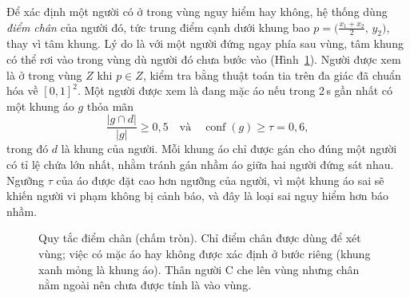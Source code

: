 \documentclass[11pt,a4paper,twocolumn]{article}
\begin{document}
Để xác định một người có ở trong vùng nguy hiểm hay không, hệ thống dùng \emph{điểm chân} của người đó, tức trung điểm cạnh dưới khung bao
$p=\big(\tfrac{x_1+x_2}{2},\,y_2\big)$, thay vì tâm khung. Lý do là với một người đứng ngay phía sau vùng, tâm khung có thể rơi vào trong vùng dù người đó chưa bước vào
(Hình~\ref{fig:foot}). Người được xem là ở trong vùng $Z$ khi $p\in Z$, kiểm tra bằng thuật toán tia trên đa giác đã chuẩn hóa về $[0,1]^2$.
Một người được xem là đang mặc áo nếu trong 2\,s gần nhất có một khung áo $g$ thỏa mãn
\begin{equation}
  \frac{|g\cap d|}{|g|}\ge 0{,}5\quad\text{và}\quad \operatorname{conf}(g)\ge\tau=0{,}6,
\end{equation}
trong đó $d$ là khung của người. Mỗi khung áo chỉ được gán cho đúng một người có tỉ lệ chứa lớn nhất, nhằm tránh gán nhầm áo giữa hai người đứng sát nhau.
Ngưỡng $\tau$ của áo được đặt cao hơn ngưỡng của người, vì một khung áo sai sẽ khiến người vi phạm không bị cảnh báo, và đây là loại sai nguy hiểm hơn báo nhầm.

\begin{figure}[t]
\centering
{}
\caption{Quy tắc điểm chân (chấm tròn). Chỉ điểm chân được dùng để xét vùng; việc có mặc áo hay không được xác định ở bước riêng (khung xanh mỏng là khung áo). Thân người C che lên vùng nhưng chân nằm ngoài nên chưa được tính là vào vùng.}
\label{fig:foot}
\end{figure}
\end{document}
